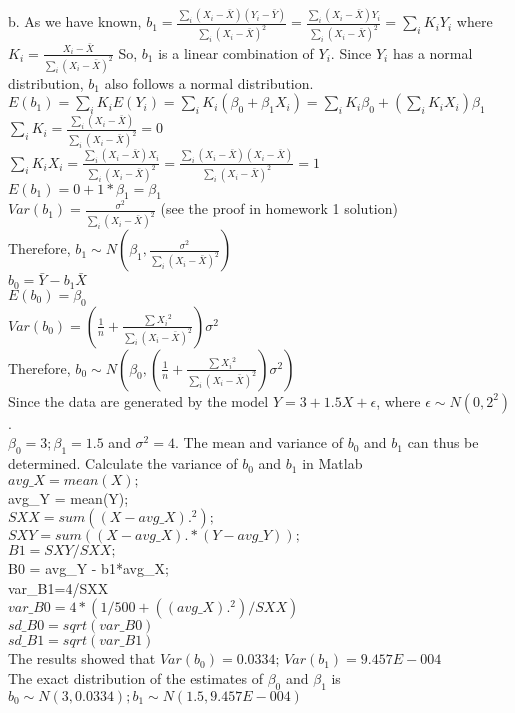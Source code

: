 \documentclass[12pt]{article}
\begin{document}
{b. As we have known,
$b_1 = \frac{\sum_i(X_i-\bar X)(Y_i - \bar Y)}{\sum_i(X_i-\bar X)^2}=\frac{\sum_i(X_i-\bar X)Y_i}{\sum_i(X_i-\bar X)^2}=\sum_i K_iY_i$     where$ K_i=\frac{X_i-\bar X}{\sum_i(X_i-\bar X)^2}$
So, $b_1$ is a linear combination of $Y_i$. Since $Y_i$ has a normal distribution, $ b_1$ also follows a normal distribution.\\
$E(b_1)=\sum_i K_iE(Y_i)=\sum_i K_i(\beta_0+\beta_1X_i)=\sum_i K_i\beta_0 +(\sum_i K_iX_i )\beta_1$\\
$\sum_i K_i=\frac{\sum_i(X_i-\bar X)}{\sum_i(X_i-\bar X)^2}=0$\\
$\sum_i K_iX_i=\frac{\sum_i(X_i-\bar X)X_i}{\sum_i(X_i-\bar X)^2}=\frac{\sum_i(X_i-\bar X)(X_i-\bar X)}{\sum_i(X_i-\bar X)^2}=1$\\
 $E(b_1)=0+1*\beta_1=\beta_1$\\
$Var(b_1)=\frac{\sigma^2}{\sum_i(X_i-\bar X)^2}$ (see the proof in homework 1 solution)\\
Therefore, $ b_1\sim N(\beta_1,\frac{\sigma^2}{\sum_i(X_i-\bar X)^2})$\\
$b_0 = \bar Y - b_1 \bar X$\\
$E(b_0)=\beta_0$\\
$Var(b_0)=(\frac{1}{n}+\frac{\sum{X_i}^2}{\sum_i(X_i-\bar X)^2})\sigma^2$\\
Therefore,  $ b_0 \sim N(\beta_0,(\frac{1}{n}+\frac{\sum{X_i}^2}{\sum_i(X_i-\bar X)^2})\sigma^2)$\\
Since the  data are  generated by the model
 $Y=3+1.5X+\epsilon$, where $\epsilon\sim N(0,2^2)$.\\
 $\beta_0=3; \beta_1=1.5 $ and $\sigma^2=4$.
The mean and variance of $b_0$ and $b_1$ can thus be determined. 
Calculate the variance of $b_0$ and $b_1$ in Matlab\\
$avg\_X= mean(X);$\\
avg\_Y = mean(Y);\\
$SXX = sum((X-avg\_X).^2);$\\
$SXY = sum((X-avg\_X).*(Y-avg\_Y));$\\
$B1 = SXY/SXX;$\\
B0 = avg\_Y - b1*avg\_X;\\
var\_B1=4/SXX\\
$var\_B0=4*(1/500+((avg\_X).^2)/SXX)$\\
$sd\_B0=sqrt(var\_B0)$\\
$sd\_B1=sqrt(var\_B1)$\\
The results showed that $Var(b_0)=0.0334$; $Var(b_1)=9.457E-004$\\
 The exact distribution of the estimates of $\beta_0$ and $\beta_1$ is 
$b_0 \sim  N(3,0.0334); b_1 \sim N(1.5,9.457E-004)$

}
\end{document}
